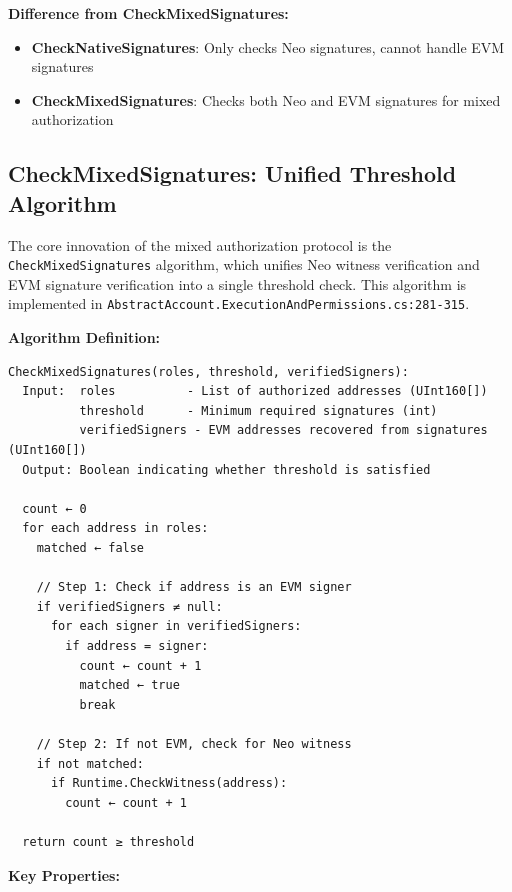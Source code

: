 \documentclass[10pt,twocolumn]{article}
\newcommand{\code}[1]{\texttt{\small #1}}
\begin{document}
{\textbf{Difference from CheckMixedSignatures:}

\begin{itemize}[leftmargin=*,topsep=2pt,itemsep=1pt]
\item \textbf{CheckNativeSignatures}: Only checks Neo signatures, cannot handle EVM signatures
\item \textbf{CheckMixedSignatures}: Checks both Neo and EVM signatures for mixed authorization
\end{itemize}

\subsection{CheckMixedSignatures: Unified Threshold Algorithm}

The core innovation of the mixed authorization protocol is the \code{CheckMixedSignatures} algorithm, which unifies Neo witness verification and EVM signature verification into a single threshold check. This algorithm is implemented in \code{AbstractAccount.ExecutionAndPermissions.cs:281-315}.

\textbf{Algorithm Definition:}

\begin{small}
\begin{verbatim}
CheckMixedSignatures(roles, threshold, verifiedSigners):
  Input:  roles          - List of authorized addresses (UInt160[])
          threshold      - Minimum required signatures (int)
          verifiedSigners - EVM addresses recovered from signatures (UInt160[])
  Output: Boolean indicating whether threshold is satisfied
  
  count ← 0
  for each address in roles:
    matched ← false
    
    // Step 1: Check if address is an EVM signer
    if verifiedSigners ≠ null:
      for each signer in verifiedSigners:
        if address = signer:
          count ← count + 1
          matched ← true
          break
    
    // Step 2: If not EVM, check for Neo witness
    if not matched:
      if Runtime.CheckWitness(address):
        count ← count + 1
  
  return count ≥ threshold
\end{verbatim}
\end{small}

\textbf{Key Properties:}

}
\end{document}

